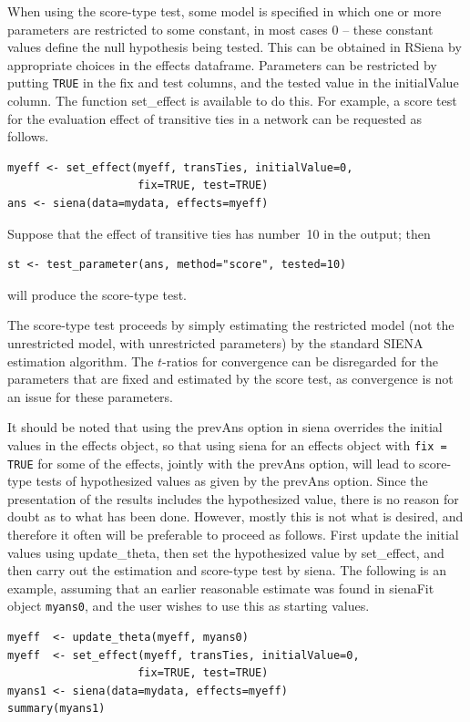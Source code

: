\documentclass[a4paper,fleqn,11pt]{article}
\newcommand{\+}{\, + \,}
\newcommand{\sfn}[1]{\textsf{#1}}
\newcommand{\RS}{{\sf \textsf{RSiena} }}
\newcommand{\SI}{{\sf SIENA }}
\begin{document}
When using the score-type test, some model
is specified in which one or more parameters are restricted to some
constant, in most cases $0$ -- these constant values
define the null hypothesis being tested.
This can be obtained in \RS by appropriate choices in the effects dataframe.
Parameters can be restricted by
putting \texttt{TRUE} in the \sfn{fix} and \sfn{test} columns, and
the tested value in the \sfn{initialValue} column.
The function \textsf{set\_effect} is available to do this.
For example, a score test for the evaluation effect of transitive ties
in a network can be requested as follows.
\begin{verbatim}
myeff <- set_effect(myeff, transTies, initialValue=0,
                    fix=TRUE, test=TRUE)
ans <- siena(data=mydata, effects=myeff)
\end{verbatim}
Suppose that the effect of transitive ties has number~10 in the output;
then
\begin{verbatim}
st <- test_parameter(ans, method="score", tested=10)
\end{verbatim}
will produce the score-type test.

The score-type test
proceeds by simply estimating the restricted model (not the unrestricted model,
with unrestricted parameters) by the standard \SI estimation algorithm.
The $t$-ratios for convergence can be disregarded for the parameters
that are fixed and estimated by the score test, as convergence is not an issue
for these parameters.

It should be noted that using the \sfn{prevAns} option in \textsf{siena}
overrides the initial values in the effects object,
so that using \sfn{siena} for an effects object with
\texttt{fix = TRUE} for some of the effects, jointly with
the \sfn{prevAns} option, will lead to score-type tests
of hypothesized values as given by the  \sfn{prevAns} option.
Since the presentation of the results includes the
hypothesized value, there is no reason for doubt as to what
has been done. However, mostly this is not what is desired,
and therefore it often will be preferable to proceed as follows.
First update the initial values using \sfn{update\_theta}, then
set the hypothesized value by \sfn{set\_effect}, and then
carry out the estimation and score-type test by \sfn{siena}.
The following is an example, assuming that an earlier
reasonable estimate was found in \sfn{sienaFit} object \texttt{myans0},
and the user wishes to use this as starting values.
\begin{verbatim}
myeff  <- update_theta(myeff, myans0)
myeff  <- set_effect(myeff, transTies, initialValue=0,
                    fix=TRUE, test=TRUE)
myans1 <- siena(data=mydata, effects=myeff)
summary(myans1)
\end{verbatim}
\end{document}
